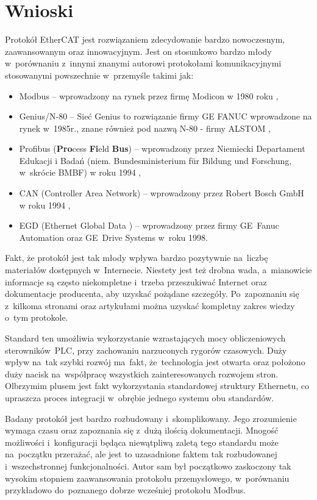 \section{Wnioski}
Protokół EtherCAT jest rozwiązaniem zdecydowanie bardzo nowoczesnym, zaawansowanym oraz innowacyjnym. 
Jest on stosunkowo bardzo młody w~porównaniu z~innymi znanymi autorowi protokołami komunikacyjnymi stosowanymi powszechnie w~przemyśle takimi jak:
\begin{itemize}
\item Modbus -- wprowadzony na rynek przez firmę Modicon w 1980 roku \cite{kwiecien},
\item Genius/N-80 -- Sieć Genius to rozwiązanie firmy GE FANUC wprowadzone na rynek w~1985r., znane również pod nazwą N-80 - firmy ALSTOM \cite{kwiecien},
\item Profibus (\textbf{Pro}cess \textbf{Fi}eld \textbf{Bus}) -- wprowadzony przez Niemiecki Departament Edukacji i Badań (niem. Bundesministerium für Bildung und Forschung, w~skrócie BMBF) w roku 1994 \cite{kwiecien},
\item CAN (Controller Area Network) -- wprowadzony przez Robert Bosch GmbH w roku 1994 \cite{kwiecien},
\item EGD (Ethernet Global Data ) -- wprowadzony przez firmy GE~Fanuc Automation oraz GE~Drive Systems w~roku 1998.
\end{itemize}

Fakt, że protokół jest tak młody wpływa bardzo pozytywnie na~liczbę materiałów dostępnych w~Internecie. Niestety jest też drobna wada, a~mianowicie informacje są często niekompletne i~trzeba przeszukiwać Internet oraz dokumentacje producenta, aby uzyskać pożądane szczegóły. Po~zapoznaniu się z~kilkoma stronami oraz artykułami można uzyskać kompletny zakres wiedzy o~tym protokole.

Standard ten umożliwia wykorzystanie wzrastających mocy obliczeniowych sterowników~PLC, przy zachowaniu narzuconych rygorów czasowych. Duży wpływ na~tak szybki rozwój ma~fakt, że~technologia jest otwarta oraz położono duży nacisk na~współpracę wszystkich zainteresowanych rozwojem stron. Olbrzymim plusem jest fakt wykorzystania standardowej struktury Ethernetu, co upraszcza proces integracji w~obrębie jednego systemu obu standardów.

Badany protokół jest bardzo rozbudowany i~skomplikowany. Jego zrozumienie wymaga czasu oraz zapoznania się z~dużą ilością dokumentacji. Mnogość możliwości i~konfiguracji będąca niewątpliwą zaletą tego standardu może na~początku przerażać, ale jest to uzasadnione faktem tak rozbudowanej i~wszechstronnej funkcjonalności. Autor sam był początkowo zaskoczony tak wysokim stopniem zaawansowania protokołu przemysłowego, w~porównaniu przykładowo do~poznanego dobrze wcześniej protokołu Modbus.
\clearpage


